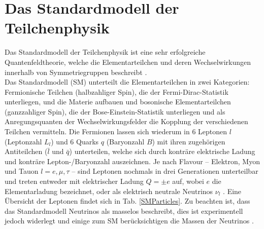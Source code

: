 \section{Das Standardmodell der Teilchenphysik}\label{SM}%
Das Standardmodell der Teilchenphysik ist eine sehr erfolgreiche Quantenfeldtheorie, welche die Elementarteilchen und deren Wechselwirkungen innerhalb von Symmetriegruppen beschreibt \cite{Mann}.\\
Das Standardmodell (SM) unterteilt die Elementarteilchen in zwei Kategorien: Fer\-mionische Teilchen (halbzahliger Spin), die der Fermi-Dirac-Statistik unterliegen, und die Materie aufbauen und bosonische Elementarteilchen (ganzzahliger Spin), die der Bose-Einstein-Statistik unterliegen und als Anregungsquanten der Wechselwirkungsfelder die Kopplung der verschiedenen Teilchen vermitteln. Die Fermionen lassen sich wiederum in $6$ Leptonen $l$ (Leptonzahl $L_l$) und $6$ Quarks $q$ (Baryonzahl $B$) mit ihren zugehörigen Antiteilchen ($\bar{l}$ und $\bar{q}$) unterteilen, welche sich durch konträre elektrische Ladung und konträre Lepton-/Baryonzahl auszeichnen. Je nach Flavour -- Elektron, Myon und Tauon $l=e,\mu,\tau$ -- sind Leptonen nochmals in drei Generationen unterteilbar und treten entweder mit elektrischer Ladung $Q=\pm e$ auf, wobei $e$ die Elementarladung bezeichnet, oder als elektrisch neutrale Neutrinos $\nu_l$ \cite{Griffiths}. Eine Übersicht der Leptonen findet sich in Tab. \ref{SMParticles}. Zu beachten ist, dass das Standardmodell Neutrinos als masselos beschreibt, dies ist experimentell jedoch widerlegt und einige zum SM berücksichtigen die Massen der Neutrinos \cite{Neutrinooszillationen}.
